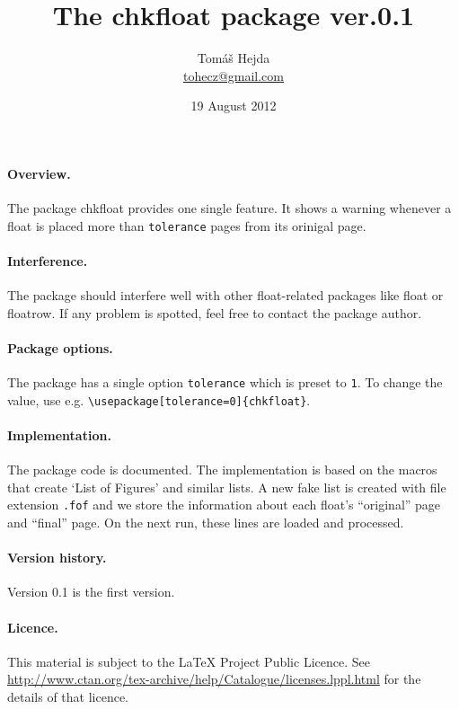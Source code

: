\documentclass{article}
\title{The {\sffamily chkfloat} package ver.\@ 0.1}
\author{Tom\'a\v s Hejda \\ \href{mailto:tohecz@gmail.com}{tohecz@gmail.com}}
\date{19 August 2012}
\begin{document}
\maketitle

\paragraph{Overview.}
The package {\sffamily chkfloat} provides one single feature.
It shows a warning whenever a float is placed more than \verb:tolerance: pages from its orinigal page.

\paragraph{Interference.}
The package should interfere well with other float-related packages like {\sffamily float} or {\sffamily floatrow}.
If any problem is spotted, feel free to contact the package author.

\paragraph{Package options.}
The package has a single option \verb:tolerance: which is preset to \verb:1:.
To change the value, use e.g. \verb:\usepackage[tolerance=0]{chkfloat}:.

\paragraph{Implementation.}
The package code is documented.
The implementation is based on the macros that create `List of Figures' and similar lists.
A new fake list is created with file extension \verb:.fof: and we store the information
 about each float's ``original'' page and ``final'' page.
On the next run, these lines are loaded and processed.

\paragraph{Version history.}
Version 0.1 is the first version.

\paragraph{Licence.}
This material is subject to the \LaTeX{} Project Public Licence.
See \url{http://www.ctan.org/tex-archive/help/Catalogue/licenses.lppl.html} for the details of that licence.
\end{document}
